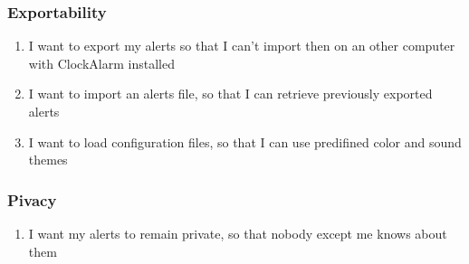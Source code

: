 \subsubsection{Exportability}
\begin{enumerate}
	\setcounter{enumi}{\value{counter}}
	\item I want to export my alerts so that I can't import then on an other computer with ClockAlarm installed
	\item I want to import an alerts file, so that I can retrieve previously exported alerts
	\item I want to load configuration files, so that I can use predifined color and sound themes
	\setcounter{counter}{\value{enumi}}
\end{enumerate}
\subsubsection{Pivacy}
\begin{enumerate}
	\setcounter{enumi}{\value{counter}}
	\item I want my alerts to remain private, so that nobody except me knows about them
\end{enumerate}